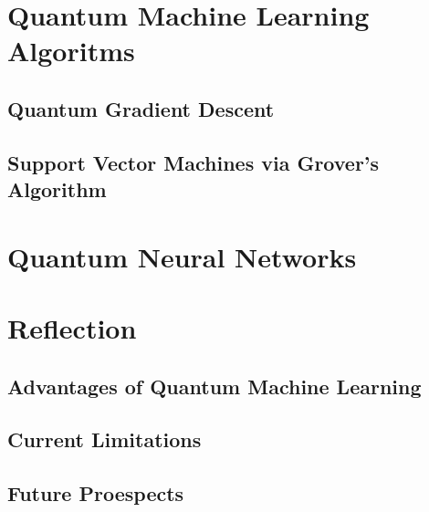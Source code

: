 \documentclass{article}
\begin{document}
\newpage
\section{Quantum Machine Learning Algoritms}
\subsection{Quantum Gradient Descent}
\subsection{Support Vector Machines via Grover's Algorithm}
\newpage
\section{Quantum Neural Networks}
\newpage
\section{Reflection}
\subsection{Advantages of Quantum Machine Learning}
\subsection{Current Limitations}
\subsection{Future Proespects}
\end{document}
